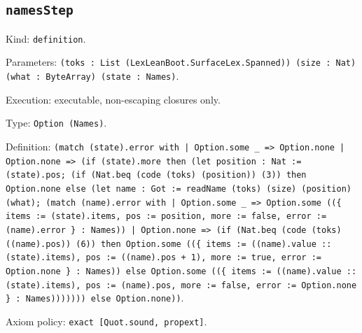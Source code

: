 \documentclass[11pt]{article}
\begin{document}
\subsection*{\texttt{namesStep}}
\noindent Kind: \texttt{definition}.\par
\noindent Parameters: \texttt{(toks : List (LexLeanBoot.SurfaceLex.Spanned)) (size : Nat) (what : ByteArray) (state : Names)}.\par
\noindent Execution: executable, non-escaping closures only.\par
\noindent Type: \texttt{Option (Names)}.\par
\noindent Definition: \texttt{(match (state).error with | Option.some \_ => Option.none | Option.none => (if (state).more then (let position : Nat := (state).pos; (if (Nat.beq (code (toks) (position)) (3)) then Option.none else (let name : Got := readName (toks) (size) (position) (what); (match (name).error with | Option.some \_ => Option.some ((\{ items := (state).items, pos := position, more := false, error := (name).error \} : Names)) | Option.none => (if (Nat.beq (code (toks) ((name).pos)) (6)) then Option.some ((\{ items := ((name).value :: (state).items), pos := ((name).pos + 1), more := true, error := Option.none \} : Names)) else Option.some ((\{ items := ((name).value :: (state).items), pos := (name).pos, more := false, error := Option.none \} : Names))))))) else Option.none))}.\par
\noindent Axiom policy: \texttt{exact [Quot.sound, propext]}.\par
\end{document}
